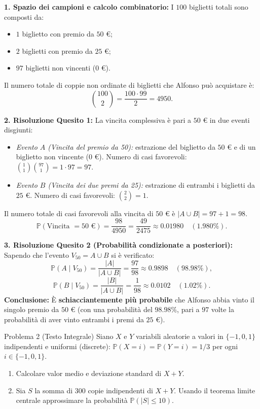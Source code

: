 \documentclass[11pt,a4paper]{article}
\newcommand{\Prob}{\mathbb{P}}
\begin{document}
\begin{soluzionebox}
\textbf{1. Spazio dei campioni e calcolo combinatorio:}
I $100$ biglietti totali sono composti da:
\begin{itemize}
    \item $1$ biglietto con premio da $50\text{ €}$;
    \item $2$ biglietti con premio da $25\text{ €}$;
    \item $97$ biglietti non vincenti ($0\text{ €}$).
\end{itemize}
Il numero totale di coppie non ordinate di biglietti che Alfonso può acquistare è:
\[
\binom{100}{2} = \frac{100 \cdot 99}{2} = 4950.
\]

\textbf{2. Risoluzione Quesito 1:}
La vincita complessiva è pari a $50\text{ €}$ in due eventi disgiunti:
\begin{itemize}
    \item \emph{Evento $A$ (Vincita del premio da 50):} estrazione del biglietto da $50\text{ €}$ e di un biglietto non vincente ($0\text{ €}$).
    Numero di casi favorevoli: $\binom{1}{1} \binom{97}{1} = 1 \cdot 97 = 97$.
    \item \emph{Evento $B$ (Vincita dei due premi da 25):} estrazione di entrambi i biglietti da $25\text{ €}$.
    Numero di casi favorevoli: $\binom{2}{2} = 1$.
\end{itemize}
Il numero totale di casi favorevoli alla vincita di $50\text{ €}$ è $|A \cup B| = 97 + 1 = 98$.
\[
\Prob(\text{Vincita } = 50\text{ €}) = \frac{98}{4950} = \frac{49}{2475} \approx \bm{0.01980} \quad (\bm{1.980\%}).
\]

\textbf{3. Risoluzione Quesito 2 (Probabilità condizionate a posteriori):}
Sapendo che l'evento $V_{50} = A \cup B$ si è verificato:
\[
\Prob(A \mid V_{50}) = \frac{|A|}{|A \cup B|} = \frac{97}{98} \approx \bm{0.9898} \quad (\bm{98.98\%}),
\]
\[
\Prob(B \mid V_{50}) = \frac{|B|}{|A \cup B|} = \frac{1}{98} \approx \bm{0.0102} \quad (\bm{1.02\%}).
\]
\textbf{Conclusione:} È \textbf{schiacciantemente più probabile} che Alfonso abbia vinto il singolo premio da $50\text{ €}$ (con una probabilità del $98.98\%$, pari a $97$ volte la probabilità di aver vinto entrambi i premi da $25\text{ €}$).
\end{soluzionebox}

\begin{problemabox}{Problema 2 (Testo Integrale)}
Siano $X$ e $Y$ variabili aleatorie a valori in $\{-1,0,1\}$ indipendenti e uniformi (discrete): $\Prob(X = i) = \Prob(Y = i) = 1/3$ per ogni $i \in \{-1,0,1\}$.
\begin{enumerate}
    \item Calcolare valor medio e deviazione standard di $X+Y$.
    \item Sia $S$ la somma di $300$ copie indipendenti di $X+Y$. Usando il teorema limite centrale approssimare la probabilità $\Prob(|S| \le 10)$.
\end{enumerate}
\end{problemabox}
\end{document}
